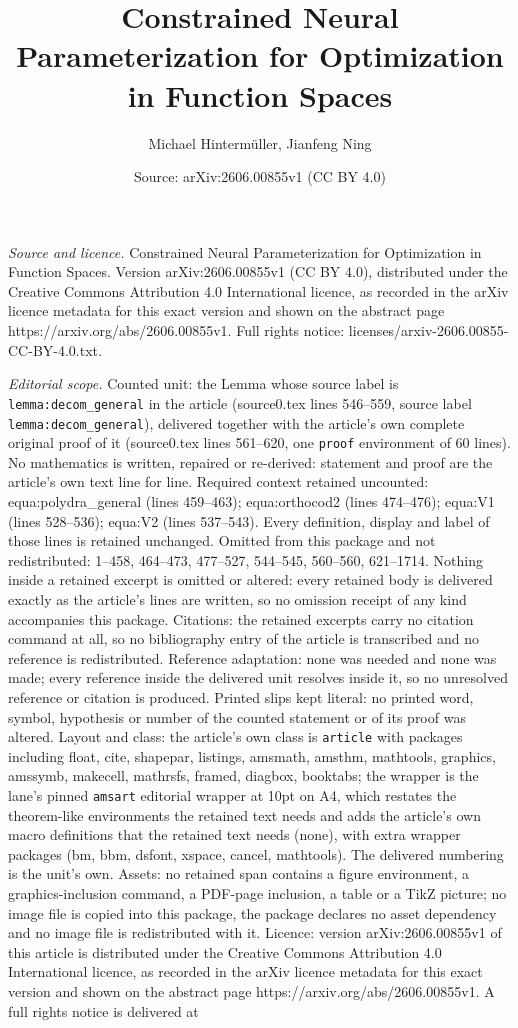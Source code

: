 \documentclass[10pt,a4paper]{amsart}
\title[Constrained Neural Parameterization for Optimization in Func]{Constrained Neural Parameterization for Optimization in Function Spaces}
\author{Michael Hinterm\"uller, Jianfeng Ning}
\date{Source: arXiv:2606.00855v1 (CC BY 4.0)}
\begin{document}
\maketitle

\noindent\emph{Source and licence.} Constrained Neural Parameterization for Optimization in Function Spaces. Version arXiv:2606.00855v1 (CC BY 4.0), distributed under the Creative Commons Attribution 4.0 International licence, as recorded in the arXiv licence metadata for this exact version and shown on the abstract page https://arxiv.org/abs/2606.00855v1. Full rights notice: licenses/arxiv-2606.00855-CC-BY-4.0.txt.\par\smallskip

\noindent\textit{Editorial scope.} Counted unit: the Lemma whose source label is \texttt{lemma:decom\_general} in the article (source0.tex lines 546--559, source label \texttt{lemma:decom\_general}), delivered together with the article's own complete original proof of it (source0.tex lines 561--620, one \texttt{proof} environment of 60 lines). No mathematics is written, repaired or re-derived: statement and proof are the article's own text line for line. Required context retained uncounted: equa:polydra\_general (lines 459--463); equa:orthocod2 (lines 474--476); equa:V1 (lines 528--536); equa:V2 (lines 537--543). Every definition, display and label of those lines is retained unchanged. Omitted from this package and not redistributed: 1--458, 464--473, 477--527, 544--545, 560--560, 621--1714. Nothing inside a retained excerpt is omitted or altered: every retained body is delivered exactly as the article's lines are written, so no omission receipt of any kind accompanies this package. Citations: the retained excerpts carry no citation command at all, so no bibliography entry of the article is transcribed and no reference is redistributed. Reference adaptation: none was needed and none was made; every reference inside the delivered unit resolves inside it, so no unresolved reference or citation is produced. Printed slips kept literal: no printed word, symbol, hypothesis or number of the counted statement or of its proof was altered. Layout and class: the article's own class is \texttt{article} with packages including float, cite, shapepar, listings, amsmath, amsthm, mathtools, graphics, amssymb, makecell, mathrsfs, framed, diagbox, booktabs; the wrapper is the lane's pinned \texttt{amsart} editorial wrapper at 10pt on A4, which restates the theorem-like environments the retained text needs and adds the article's own macro definitions that the retained text needs (none), with extra wrapper packages (bm, bbm, dsfont, xspace, cancel, mathtools). The delivered numbering is the unit's own. Assets: no retained span contains a figure environment, a graphics-inclusion command, a PDF-page inclusion, a table or a TikZ picture; no image file is copied into this package, the package declares no asset dependency and no image file is redistributed with it. Licence: version arXiv:2606.00855v1 of this article is distributed under the Creative Commons Attribution 4.0 International licence, as recorded in the arXiv licence metadata for this exact version and shown on the abstract page https://arxiv.org/abs/2606.00855v1. A full rights notice is delivered at 
\end{document}
